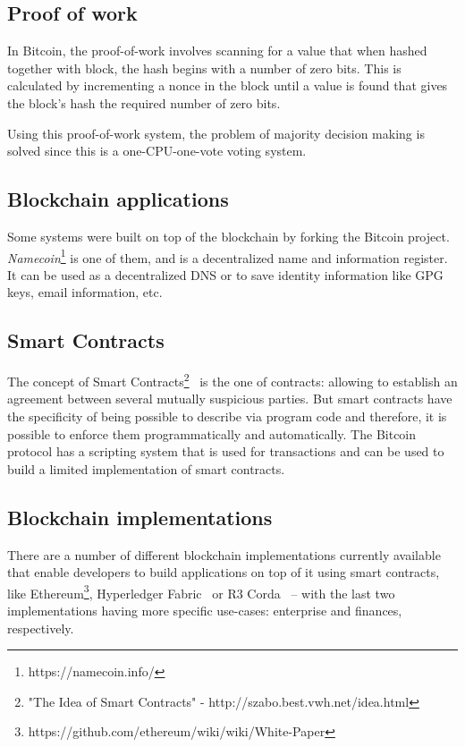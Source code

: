 \subsection{Proof of work}
In Bitcoin, the proof-of-work involves scanning for a value that when hashed together with block, the hash begins with a number of zero bits. This is calculated by incrementing a nonce in the block until a value is found that gives the block's hash the required number of zero bits.

Using this proof-of-work system, the problem of majority decision making is solved since this is a one-CPU-one-vote voting system.

\subsection{Blockchain applications}
Some systems were built on top of the blockchain by forking the Bitcoin project.
\textit{Namecoin}\footnote{https://namecoin.info/} is one of them, and is a decentralized name and information register. It can be used as a decentralized DNS or to save identity information like GPG keys, email information, etc.

\subsection{Smart Contracts} The concept of Smart Contracts\footnote{"The Idea of Smart Contracts" - http://szabo.best.vwh.net/idea.html}~\cite{40673} is the one of contracts: allowing to establish an agreement between several mutually suspicious parties. But smart contracts have the specificity of being possible to describe via program code and therefore, it is possible to enforce them programmatically and automatically.
The Bitcoin protocol has a scripting system that is used for transactions and can be used to build a limited implementation of smart contracts.


\subsection{Blockchain implementations}

There are a number of different blockchain implementations currently available that enable developers to build applications on top of it using smart contracts, like Ethereum\footnote{https://github.com/ethereum/wiki/wiki/White-Paper}, Hyperledger Fabric~\cite{cachin2016architecture} or R3 Corda~\cite{mikehearn2016} – with the last two implementations having more specific use-cases: enterprise and finances, respectively.

